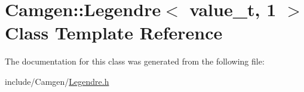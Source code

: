\hypertarget{a00321}{\section{Camgen\-:\-:Legendre$<$ value\-\_\-t, 1 $>$ Class Template Reference}
\label{a00321}
}


The documentation for this class was generated from the following file\-:\begin{DoxyCompactItemize}
\item 
include/\-Camgen/\hyperlink{a00657}{Legendre.\-h}\end{DoxyCompactItemize}
